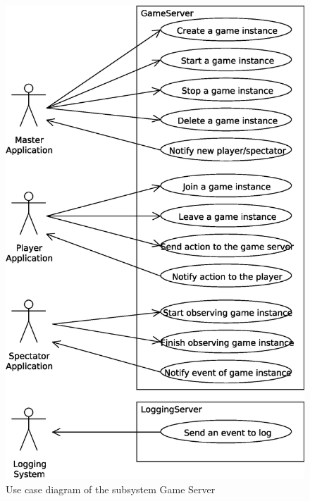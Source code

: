 \begin{figure}[htbp!]
\begin{center}
\includegraphics[scale=0.55]{Figures/_integration_use_case_game_server}
\caption{Use case diagram of the subsystem \textsf{Game Server}}
\label{F_integration_use_case_game_server}
\end{center}
\end{figure}

\newpage

